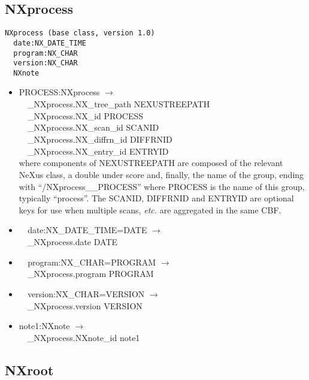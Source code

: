 \documentclass[11pt]{article}
\begin{document}
{{\subsection{NXprocess}

\begin{verbatim}
NXprocess (base class, version 1.0)
  date:NX_DATE_TIME
  program:NX_CHAR
  version:NX_CHAR
  NXnote
\end{verbatim}

\begin{itemize}

\item{PROCESS:NXprocess $\rightarrow$\\
\verb|  |\_NXprocess.NX\_tree\_path    NEXUSTREEPATH \\
\verb|  |\_NXprocess.NX\_id            PROCESS\\
\verb|  |\_NXprocess.NX\_scan\_id      SCANID \\
\verb|  |\_NXprocess.NX\_diffrn\_id    DIFFRNID \\
\verb|  |\_NXprocess.NX\_entry\_id     ENTRYID \\
where components of NEXUSTREEPATH are composed of the
relevant NeXus class, a double under score and, finally, the
name of the group, ending with ``/NXprocess\_\_PROCESS''
where PROCESS is the name of this group, typically ``process''.
The SCANID, DIFFRNID and ENTRYID are optional keys for use
when multiple scans, {\it etc.} are aggregated in the same CBF.}

\item{\verb|  |date:NX\_DATE\_TIME=DATE $\rightarrow$\\
\verb|  |\_NXprocess.date DATE}

\item{\verb|  |program:NX\_CHAR=PROGRAM $\rightarrow$\\
\verb|  |\_NXprocess.program PROGRAM}

\item{\verb|  |version:NX\_CHAR=VERSION $\rightarrow$\\
\verb|  |\_NXprocess.version VERSION}

\item{note1:NXnote $\rightarrow$\\
\verb|  |\_NXprocess.NXnote\_id note1}
\end{itemize}
\subsection{NXroot}

}}
\end{document}
